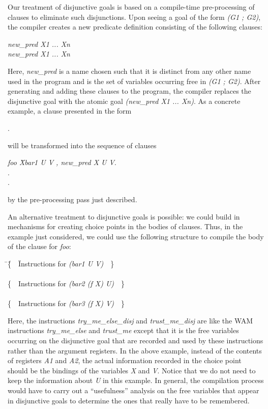 Our treatment of disjunctive goals is based on a compile-time
pre-processing of clauses to eliminate such disjunctions. Upon seeing
a goal of the form {\it (G1 ; G2)}, the compiler creates a new
predicate definition consisting of the following clauses:
\begin{tabbing}
\dquad\dquad\=
{\it new\_pred  X1 ... Xn}\quad {}\\
\>
{\it new\_pred  X1 ... Xn}\quad {}
\end{tabbing}
Here, {\it new\_pred} is a name chosen such that it is distinct from
any other name used in the program and  is the
set of variables occurring free in {\it (G1 ; G2)}. After generating
and adding these clauses to the program, the compiler replaces the
disjunctive goal with the atomic goal {\it (new\_pred X1 ... Xn)}.
As a concrete example, a clause presented in the form
\begin{tabbing}
\dquad{}\quad {}.
\end{tabbing}
will be transformed into the sequence of clauses
\begin{tabbing}
\dquad\dquad\={\it foo X}\dquad\dquad\dquad\= \quad\= {\it bar1 U V , new\_pred X U V}.\\
\>. \\
\>.
\end{tabbing}
by the pre-processing pass just described.

An alternative treatment to disjunctive goals is possible: we could
build in mechanisms for creating choice points in the bodies of
clauses. Thus, in the example just considered, we could use the
following structure to compile the body of the clause for {\it foo}:
\begin{tabbing}
\dquad\=\dquad\= \{\ \ \= Instructions for {\it (bar1 U V)}\ \ \}\\
      \>       \> \\
      \>       \>\{\ \ Instructions for {\it (bar2 (f X) U)}\ \ \} \\
      \> \\
      \>       \>\{\ \ Instructions for {\it (bar3 (f X) V)}\ \ \}
\end{tabbing}
Here, the instructions {\it try\_me\_else\_disj} and {\it
  trust\_me\_disj} are like the WAM instructions {\it try\_me\_else}
and {\it trust\_me} except that it is the free variables occurring on
the disjunctive goal that are recorded and used by these instructions
rather than the argument registers. In the above example, instead of
the contents of registers
{\it A1} and {\it A2}, the actual information
recorded in the choice point should be the bindings of the variables
{\it X} and {\it V}.
Notice that we do not need to keep the information about {\it U} in
this example. In general, the compilation process would have to carry
out a ``usefulness'' analysis on the free variables that appear in
disjunctive goals to determine the ones that really have to be
remembered.

